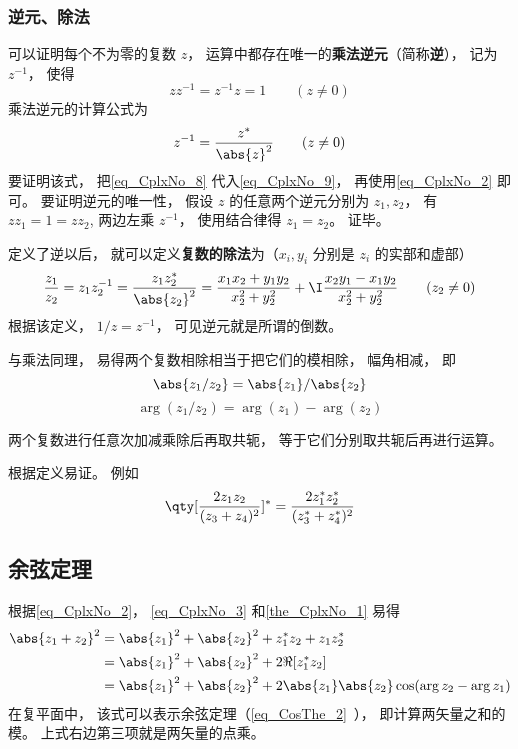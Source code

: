 \subsubsection{逆元、除法}
可以证明每个不为零的复数 $z$， 运算中都存在唯一的\textbf{乘法逆元}（简称\textbf{逆}）， 记为 $z^{-1}$， 使得
\begin{equation}\label{eq_CplxNo_9}
zz^{-1} = z^{-1}z = 1 \qquad (z \ne 0)
\end{equation}
乘法逆元的计算公式为
\begin{equation}\label{eq_CplxNo_8}
z^{-1} = \frac{z^*}{\abs{z}^2} \qquad (z \ne 0)
\end{equation}
要证明该式， 把\autoref{eq_CplxNo_8} 代入\autoref{eq_CplxNo_9}， 再使用\autoref{eq_CplxNo_2} 即可。 要证明逆元的唯一性， 假设 $z$ 的任意两个逆元分别为 $z_1, z_2$， 有 $zz_1 = 1 = zz_2$, 两边左乘 $z^{-1}$， 使用结合律得 $z_1 = z_2$。 证毕。

定义了逆以后， 就可以定义\textbf{复数的除法}为（$x_i,y_i$ 分别是 $z_i$ 的实部和虚部）
\begin{equation}\label{eq_CplxNo_7}
\frac{z_1}{z_2} = z_1z_2^{-1} = \frac{z_1z_2^*}{\abs{z_2}^2} = \frac{x_1 x_2 + y_1 y_2}{x_2^2 + y_2^2} + \I \frac{x_2 y_1 - x_1 y_2}{x_2^2 + y_2^2} \qquad (z_2 \ne 0)
\end{equation}
根据该定义， $1/z = z^{-1}$， 可见逆元就是所谓的倒数。

与乘法同理， 易得两个复数相除相当于把它们的模相除， 幅角相减， 即
\begin{equation}
\abs{z_1/z_2} = \abs{z_1}/\abs{z_2}
\end{equation}
\begin{equation}
\arg(z_1/z_2) = \arg(z_1) - \arg(z_2)
\end{equation}

\begin{theorem}{}\label{the_CplxNo_1}
两个复数进行任意次加减乘除后再取共轭， 等于它们分别取共轭后再进行运算。
\end{theorem}
根据定义易证。 例如
\begin{equation}
\qty[\frac{2 z_1 z_2}{(z_3 + z_4)^2}]^* = \frac{2 z_1^* z_2^*}{(z_3^* + z_4^*)^2}
\end{equation}

\subsection{余弦定理}
根据\autoref{eq_CplxNo_2}， \autoref{eq_CplxNo_3} 和\autoref{the_CplxNo_1} 易得
\begin{equation}
\begin{aligned}
\abs{z_1 + z_2}^2 &= \abs{z_1}^2 + \abs{z_2}^2 + z_1^* z_2 + z_1 z_2^*\\
&= \abs{z_1}^2 + \abs{z_2}^2 + 2\Re[z_1^* z_2]\\
&= \abs{z_1}^2 + \abs{z_2}^2 + 2\abs{z_1}\abs{z_2}\cos(\arg z_2 - \arg z_1)
\end{aligned}
\end{equation}
在复平面中， 该式可以表示余弦定理（\autoref{eq_CosThe_2}~）， 即计算两矢量之和的模。 上式右边第三项就是两矢量的点乘。
